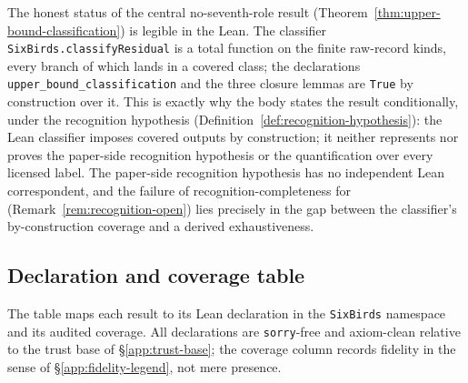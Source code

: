 The honest status of the central no-seventh-role result
(Theorem~\ref{thm:upper-bound-classification}) is legible in the Lean. The
classifier \texttt{SixBirds.classifyResidual} is a total function on the finite
raw-record kinds, every branch of which lands in a covered class; the
declarations \texttt{upper\_bound\_classification} and the three closure lemmas
are \texttt{True} by construction over it. This is exactly why the body states
the result conditionally, under the recognition hypothesis
(Definition~\ref{def:recognition-hypothesis}): the Lean classifier imposes
covered outputs by construction; it neither represents nor proves the
paper-side recognition hypothesis or the quantification over every licensed
label. The
paper-side recognition hypothesis has no independent Lean correspondent, and the
failure of recognition-completeness for \FATCD{}
(Remark~\ref{rem:recognition-open}) lies precisely in the gap between the classifier's by-construction coverage and a derived
exhaustiveness.

\subsection{Declaration and coverage table}\label{app:table}

The table maps each result to its Lean declaration in the \texttt{SixBirds}
namespace and its audited coverage. All declarations are \texttt{sorry}-free and
axiom-clean relative to the trust base of \S\ref{app:trust-base}; the coverage
column records fidelity in the sense of \S\ref{app:fidelity-legend}, not mere
presence.

